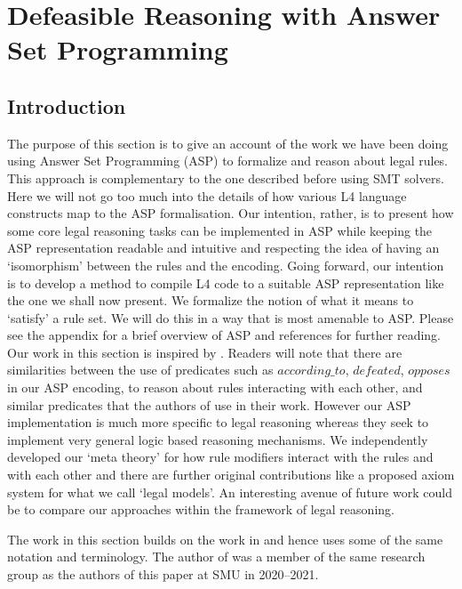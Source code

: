 \section{Defeasible Reasoning with Answer Set Programming}\label{sec:defeasible_asp}



\subsection{Introduction}
The purpose of this section is to give an account of the work we have been doing using Answer Set Programming (ASP) to formalize and reason about legal rules. This approach is complementary to the one described before using SMT solvers. Here we will not go too much into the details of how various L4 language constructs map to the ASP formalisation. Our intention, rather, is to present how some core legal reasoning tasks can be implemented in ASP while keeping the ASP representation readable and intuitive and respecting the idea of having an `isomorphism' between the rules and the encoding. Going forward, our intention is to develop a method to compile L4 code to a suitable ASP representation like the one we shall now present. We formalize the notion of what it means to `satisfy' a rule set. We will do this in a way that is most amenable to ASP. Please see the appendix for a brief overview of ASP and references for further reading.\\

Our work in this section is inspired by \cite{DBLP:conf/iclp/WanGKFL09}. Readers will note that there are similarities between the use of predicates such as $according\_to$, $defeated$, $opposes$ in our ASP encoding, to reason about rules interacting with each other, and similar predicates that the authors of \cite{DBLP:conf/iclp/WanGKFL09} use in their work. However our ASP implementation is much more specific to legal reasoning whereas they seek to implement very general logic based reasoning mechanisms. We independently developed our `meta theory' for how rule modifiers interact with the rules and with each other and there are further original contributions like a proposed axiom system for what we call `legal models'. An interesting avenue of future work could be to compare our approaches within the framework of legal reasoning.

The work in this section builds on the work in \cite{morris21:_const_answer_set_progr_tool} and hence uses some of the same notation and terminology. The author of \cite{morris21:_const_answer_set_progr_tool} was a member of the same research group as the authors of this paper at SMU in 2020--2021.


